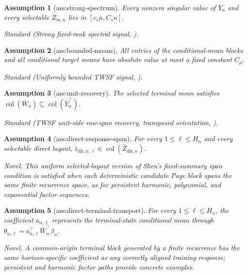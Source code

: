 \documentclass{article}
\newtheorem{assumption}{Assumption}
\begin{document}
\begin{assumption}[ass:strong-spectrum]\label{ass:strong-spectrum}
Every nonzero singular value of \(\bar Y_n\) and every selectable \(\bar Z_{m,n}\) lies in \([c_s n,C_s n]\).
\par\smallskip\noindent\emph{Standard} (Strong fixed-rank spectral signal, \cite{Shen2026TWSF}).
\end{assumption}

\begin{assumption}[ass:bounded-means]\label{ass:bounded-means}
All entries of the conditional-mean blocks and all conditional target means have absolute value at most a fixed constant \(C_\mu\).
\par\smallskip\noindent\emph{Standard} (Uniformly bounded TWSF signal, \cite{Shen2026TWSF}).
\end{assumption}

\begin{assumption}[ass:unit-recovery]\label{ass:unit-recovery}
The selected terminal mean satisfies \(\operatorname{col}(\bar W_n)\subseteq\operatorname{col}(\bar Y_n^{\top})\).
\par\smallskip\noindent\emph{Standard} (TWSF unit-side row-span recovery, transposed orientation, \cite{Shen2026TWSF}).
\end{assumption}

\begin{assumption}[ass:direct-response-span]\label{ass:direct-response-span}
For every \(1\le\ell\le H_n\) and every selectable direct layout, \(\bar z_{\mathrm{dir},n,\ell}\in\operatorname{col}(\bar Z_{\mathrm{dir},n})\).
\par\smallskip\noindent\emph{Novel.} This uniform selected-layout version of Shen's fixed-summary span condition is satisfied when each deterministic candidate Page block spans the same finite recurrence space, as for persistent harmonic, polynomial, and exponential factor sequences.
\end{assumption}

\begin{assumption}[ass:direct-terminal-transport]\label{ass:direct-terminal-transport}
For every \(1\le\ell\le H_n\), the coefficient \(a_{n,\ell}\) represents the terminal-state conditional mean through \(\theta_{n,\ell}=a_{n,\ell}^{\top}\bar W_n^{\top}\beta_n\).
\par\smallskip\noindent\emph{Novel.} A common-origin terminal block generated by a finite recurrence has the same horizon-specific coefficient as any correctly aligned training response; persistent and harmonic factor paths provide concrete examples.
\end{assumption}
\end{document}
